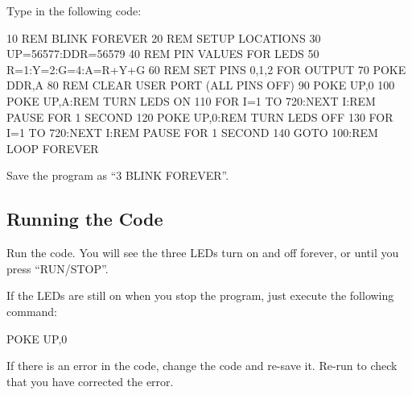 Type in the following code:
\begin{basic}
10 REM BLINK FOREVER
20 REM SETUP LOCATIONS
30 UP=56577:DDR=56579
40 REM PIN VALUES FOR LEDS
50 R=1:Y=2:G=4:A=R+Y+G
60 REM SET PINS 0,1,2 FOR OUTPUT
70 POKE DDR,A
80 REM CLEAR USER PORT (ALL PINS OFF)
90 POKE UP,0
100 POKE UP,A:REM TURN LEDS ON
110 FOR I=1 TO 720:NEXT I:REM PAUSE FOR 1 SECOND
120 POKE UP,0:REM TURN LEDS OFF
130 FOR I=1 TO 720:NEXT I:REM PAUSE FOR 1 SECOND
140 GOTO 100:REM LOOP FOREVER
\end{basic}

Save the program as ``3 BLINK FOREVER''.

\subsection*{Running the Code}

Run the code.  You will see the three LEDs turn on and off forever, or until you press ``RUN/STOP''.

If the LEDs are still on when you stop the program, just execute the following command:
\begin{basic}
POKE UP,0
\end{basic}

If there is an error in the code, change the code and re-save it.  Re-run to check that you have corrected the error.
